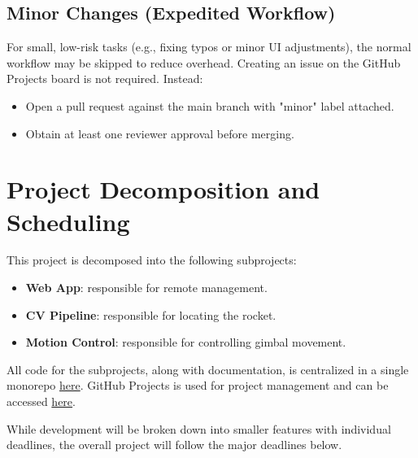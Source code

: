 \documentclass{article}
\begin{document}
\subsection{Minor Changes (Expedited Workflow)}

For small, low-risk tasks (e.g., fixing typos or minor UI adjustments), the
normal workflow may be skipped to reduce overhead. Creating an issue on the
GitHub Projects board is not required. Instead:
\begin{itemize}
  \item Open a pull request against the main branch with "minor" label attached.
  \item Obtain at least one reviewer approval before merging.
\end{itemize}

\section{Project Decomposition and Scheduling}

This project is decomposed into the following subprojects:

\begin{itemize}
  \item \textbf{Web App}: responsible for remote management.
  \item \textbf{CV Pipeline}: responsible for locating the rocket.
  \item \textbf{Motion Control}: responsible for controlling gimbal movement.
\end{itemize}

All code for the subprojects, along with documentation, is centralized in a
single monorepo \href{https://github.com/ZifanSi/vision-guided-tracker}{here}.
GitHub Projects is used for project management and can be accessed
\href{https://github.com/users/ZifanSi/projects/1}{here}.

While development will be broken down into smaller features with individual
deadlines, the overall project will follow the major deadlines below.
\end{document}
